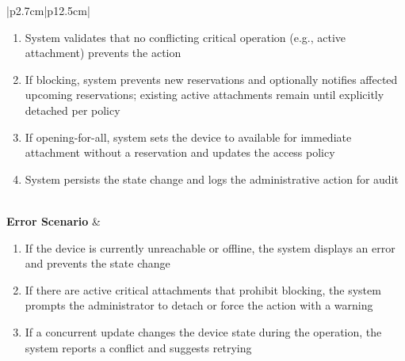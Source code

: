 \begin{table}[H]
\begin{tabular}{|p{2.7cm}|p{12.5cm}|}
\begin{minipage}[t]{\linewidth}
\begin{enumerate}[topsep=0pt,itemsep=1pt,parsep=0pt,partopsep=0pt]
                                          \item System validates that no conflicting critical operation (e.g., active
                                                attachment) prevents the action
                                          \item If blocking, system prevents new reservations and optionally notifies affected
                                                upcoming reservations; existing active attachments remain until explicitly
                                                detached per policy
                                          \item If opening-for-all, system sets the device to available for immediate
                                                attachment without a reservation and updates the access policy
                                          \item System persists the state change and logs the administrative action for audit
                                      \end{enumerate}
                                  \end{minipage}                                                                                                                                   \\
        \hline
        \textbf{Error Scenario} & \begin{minipage}[t]{\linewidth}
                                      \begin{enumerate}[topsep=0pt,itemsep=1pt,parsep=0pt,partopsep=0pt]
                                          \item If the device is currently unreachable or offline, the system displays an error
                                                and prevents the state change
                                          \item If there are active critical attachments that prohibit blocking, the system
                                                prompts the administrator to detach or force the action with a warning
                                          \item If a concurrent update changes the device state during the operation, the
                                                system reports a conflict and suggests retrying
                                      \end{enumerate}
                                  \end{minipage}                                                                                                                                  \\
        \hline
    \end{tabular}
    \label{tab:admin-block-device}
\end{table}
